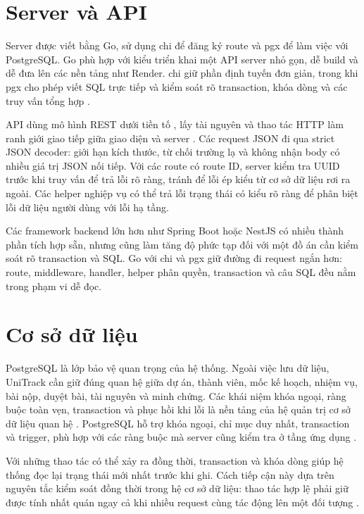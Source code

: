 \section{Server và API}

Server được viết bằng Go, sử dụng chi để đăng ký route và pgx để làm việc với PostgreSQL. Go phù hợp với kiểu triển khai một API server nhỏ gọn, dễ build và dễ đưa lên các nền tảng như Render. chi giữ phần định tuyến đơn giản, trong khi pgx cho phép viết SQL trực tiếp và kiểm soát rõ transaction, khóa dòng và các truy vấn tổng hợp \cite{go,chi,pgx}.

API dùng mô hình REST dưới tiền tố , lấy tài nguyên và thao tác HTTP làm ranh giới giao tiếp giữa giao diện và server \cite{fielding2000rest}. Các request JSON đi qua strict JSON decoder: giới hạn kích thước, từ chối trường lạ và không nhận body có nhiều giá trị JSON nối tiếp. Với các route có route ID, server kiểm tra UUID trước khi truy vấn để trả lỗi rõ ràng, tránh để lỗi ép kiểu từ cơ sở dữ liệu rơi ra ngoài. Các helper nghiệp vụ có thể trả lỗi trạng thái có kiểu rõ ràng để phân biệt lỗi dữ liệu người dùng với lỗi hạ tầng.

Các framework backend lớn hơn như Spring Boot hoặc NestJS có nhiều thành phần tích hợp sẵn, nhưng cũng làm tăng độ phức tạp đối với một đồ án cần kiểm soát rõ transaction và SQL. Go với chi và pgx giữ đường đi request ngắn hơn: route, middleware, handler, helper phân quyền, transaction và câu SQL đều nằm trong phạm vi dễ đọc.

\section{Cơ sở dữ liệu}

PostgreSQL là lớp bảo vệ quan trọng của hệ thống. Ngoài việc lưu dữ liệu, UniTrack cần giữ đúng quan hệ giữa dự án, thành viên, mốc kế hoạch, nhiệm vụ, bài nộp, duyệt bài, tài nguyên và minh chứng. Các khái niệm khóa ngoại, ràng buộc toàn vẹn, transaction và phục hồi khi lỗi là nền tảng của hệ quản trị cơ sở dữ liệu quan hệ \cite{silberschatz2020database}. PostgreSQL hỗ trợ khóa ngoại, chỉ mục duy nhất, transaction và trigger, phù hợp với các ràng buộc mà server cũng kiểm tra ở tầng ứng dụng \cite{postgresql}.

Với những thao tác có thể xảy ra đồng thời, transaction và khóa dòng giúp hệ thống đọc lại trạng thái mới nhất trước khi ghi. Cách tiếp cận này dựa trên nguyên tắc kiểm soát đồng thời trong hệ cơ sở dữ liệu: thao tác hợp lệ phải giữ được tính nhất quán ngay cả khi nhiều request cùng tác động lên một đối tượng \cite{bernstein1987concurrency}.


